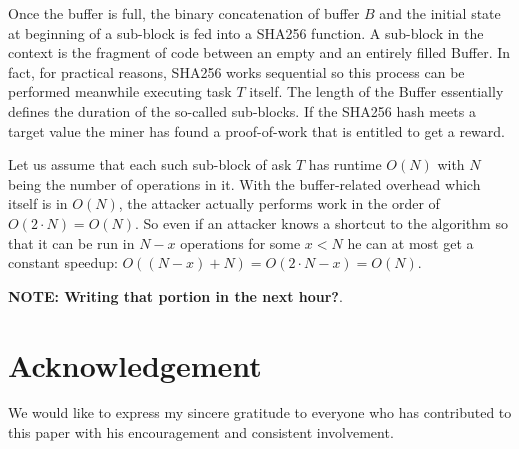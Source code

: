\documentclass{sig-alternate}
\begin{document}
Once the buffer is full, the binary concatenation of buffer $B$ and the initial state at beginning of a sub-block is fed into a SHA256 function. A sub-block in the context is the fragment of code between an empty and an entirely filled Buffer. In fact, for practical reasons, SHA256 works sequential so this process can be performed meanwhile executing task $T$ itself. The length of the Buffer essentially defines the duration of the so-called sub-blocks. If the SHA256 hash meets a target value the miner has found a proof-of-work that is entitled to get a reward.

Let us assume that each such sub-block of ask $T$ has runtime $O(N)$ with $N$ being the number of operations in it. With the buffer-related overhead which itself is in $O(N)$, the attacker actually performs work in the order of $O(2 \cdot N) = O(N)$. So even if an attacker knows a shortcut to the algorithm so that it can be run in $N-x$ operations for some $x<N$ he can at most get a constant speedup: $O((N-x)+N) = O(2 \cdot N-x) = O(N)$.



\textbf{NOTE: Writing that portion in the next hour?}.

\section*{Acknowledgement}

We would like to express my sincere gratitude to everyone who has contributed to this paper with his encouragement and consistent involvement.



\end{document}
